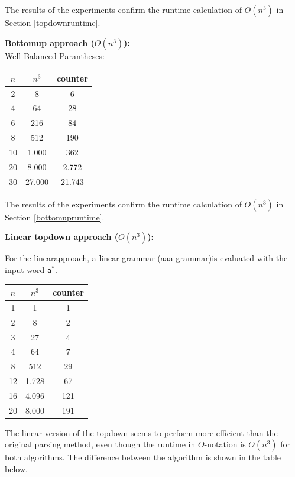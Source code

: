 \documentclass[a4paper, 11pt]{article}
\begin{document}
The results of the experiments confirm the runtime calculation of $O(n^3)$ in Section \ref{topdownruntime}.



\textbf{Bottomup approach ($O(n^3)$):} \\

Well-Balanced-Parantheses: \\

\begin{center}

\begin{tabular}{|c|c|c|}
\hline
$n$ & $n^3$ & counter \\
\hline
2& 8 & 6\\
4& 64 & 28\\
6& 216 & 84\\
8& 512 & 190 \\
10& 1.000 & 362 \\
20& 8.000 & 2.772 \\
30& 27.000 & 21.743\\
\hline
\end{tabular}
\end{center}

    


The results of the experiments confirm the runtime calculation of $O(n^3)$ in Section \ref{bottomupruntime}.



\textbf{Linear topdown approach ($O(n^3)$):} 

For the linearapproach, a linear grammar (aaa-grammar)is evaluated with the input word \texttt{a$^*$}.

\begin{center}

\begin{tabular}{|c|c|c|}
\hline
$n$ & $n^3$ & counter \\
\hline
1& 1 & 1\\
2& 8 & 2\\
3& 27 & 4\\
4& 64 & 7\\
8& 512 & 29 \\
12& 1.728 & 67 \\
16& 4.096 & 121 \\
20& 8.000 & 191 \\
\hline
\end{tabular}
\end{center}

The linear version of the topdown seems to perform more efficient than the original parsing method, even though the runtime in $O$-notation is $O(n^3)$ for both algorithms. The difference between the algorithm is shown in the table below. 
\end{document}
